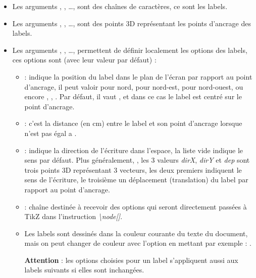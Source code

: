     \begin{itemize}
    \item  Les arguments , , \ldots, sont des chaînes de caractères, ce sont les labels.
    \item  Les arguments , , \ldots, sont des points 3D représentant les points d'ancrage des labels.
    \item  Les arguments , , \ldots,  permettent de définir localement les options des labels, ces options sont (avec leur valeur par défaut) :

        \begin{itemize}
            \item {} : indique la position du label dans le plan de l'écran par rapport au point d'ancrage, il peut valoir  pour nord,  pour nord-est,  pour nord-ouest, ou encore , , . Par défaut, il vaut , et dans ce cas le label est centré sur le point  d'ancrage.
            
            \item {} : c'est la distance (en cm) entre le label et son point d'ancrage lorsque  n'est pas égal a .
            
            \item {} : indique la direction de l'écriture dans l'espace, la liste vide indique le sens par défaut. Plus généralement, , les 3 valeurs \emph{dirX}, \emph{dirY} et \emph{dep} sont trois points 3D représentant 3 vecteurs, les deux premiers indiquent le sens de l'écriture, le troisième un déplacement (translation) du label par rapport au point d'ancrage.
            
            \item {} : chaîne destinée à recevoir des options qui seront directement passées à TikZ dans l'instruction \emph{\textbackslash node[]}.
            
            \item Les labels sont dessinés dans la couleur courante du texte du document, mais on peut changer de couleur avec l'option  en mettant par exemple : .
            
            \textbf{Attention} : les options choisies pour un label s'appliquent aussi aux labels suivants si elles sont inchangées.
        \end{itemize}
  \end{itemize}

